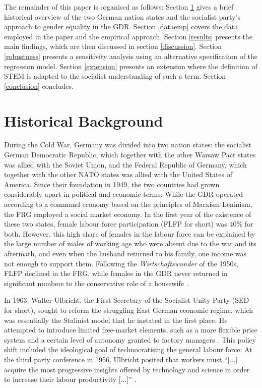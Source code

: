 \documentclass[a4paper, oneside, hyperfootnotes = false]{article}
\begin{document}
{The remainder of this paper is organised as follows: Section \ref{background} gives a brief historical overview of the two German nation states and the socialist party's approach to gender equality in the GDR. Section \ref{dataemp} covers the data employed in the paper and the empirical approach. Section \ref{results} presents the main findings, which are then discussed in section \ref{discussion}. Section \ref{robustness} presents a sensitivity analysis using an alternative specification of the regression model. Section \ref{extension} presents an extension where the definition of STEM is adapted to the socialist understanding of such a term. Section \ref{conclusion} concludes.

\section{Historical Background}
\label{background}

During the Cold War, Germany was divided into two nation states: the socialist German Democratic Republic, which together with the other Warsaw Pact states was allied with the Soviet Union, and the Federal Republic of Germany, which together with the other NATO states was allied with the United States of America.
Since their foundation in 1949, the two countries had grown considerably apart in political and economic terms:
While the GDR operated according to a command economy based on the principles of Marxism-Leninism, the FRG employed a social market economy.
In the first year of the existence of these two states, female labour force participation (FLFP for short) was 40\% \citep[Chapter~2]{Menschik1974} for both.
However, this high share of females in the labour force can be explained by the large number of males of working age who were absent due to the war and its aftermath, and even when the husband returned to his family, one income was not enough to support them.
Following the \emph{Wirtschaftswunder} of the 1950s, FLFP declined in the FRG, while females in the GDR never returned in significant numbers to the conservative role of a housewife \citep{Ostner1991, Rosenfeld2004}.

In 1963, Walter Ulbricht, the First Secretary of the Socialist Unity Party (SED for short), sought to reform the struggling East German economic regime, which was essentially the Stalinist model that he instated in the first place. He attempted to introduce limited free-market elements, such as a more flexible price system and a certain level of autonomy granted to factory managers \citep[Chapter~4]{Grieder1999}.
This policy shift included the ideological goal of technocratising the general labour force:
At the third party conference in 1956, Ulbricht posited that workers must ``[...] acquire the most progressive insights offered by technology and science in order to increase their labour productivity [...]'' \citep{Ulbricht1956, Sanderson1981}.

}
\end{document}
